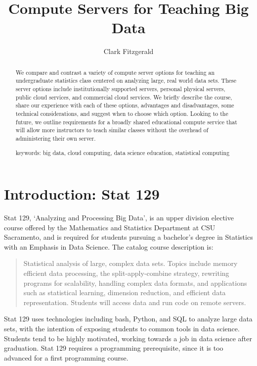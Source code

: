 \documentclass[12pt]{article}
\title{Compute Servers for Teaching Big Data}
\author[1]{Clark Fitzgerald}
\affil[1]{Department of Mathematics and Statistics \protect\\ California State University Sacramento}
\begin{document}
\maketitle

\begin{abstract}

    We compare and contrast a variety of compute server options for teaching an undergraduate statistics class centered on analyzing large, real world data sets.
These server options include institutionally supported servers, personal physical servers, public cloud services, and commercial cloud services.
We briefly describe the course, share our experience with each of these options, advantages and disadvantages, some technical considerations, and suggest when to choose which option.
Looking to the future, we outline requirements for a broadly shared educational compute service that will allow more instructors to teach similar classes without the overhead of administering their own server.

\vspace{0.2in}
keywords: big data, cloud computing, data science education, statistical computing

\end{abstract}



\section{Introduction: Stat 129}

Stat 129, `Analyzing and Processing Big Data', is an upper division elective course offered by the Mathematics and Statistics Department at CSU Sacramento, and is required for students pursuing a bachelor's degree in Statistics with an Emphasis in Data Science.
The catalog course description is:

\begin{quote}
Statistical analysis of large, complex data sets. Topics include memory efficient data processing, the split-apply-combine strategy, rewriting programs for scalability, handling complex data formats, and applications such as statistical learning, dimension reduction, and efficient data representation. Students will access data and run code on remote servers.
\end{quote}

Stat 129 uses technologies including bash, Python, and SQL to analyze large data sets, with the intention of exposing students to common tools in data science.
Students tend to be highly motivated, working towards a job in data science after graduation.
Stat 129 requires a programming prerequisite, since it is too advanced for a first programming course.
\end{document}
